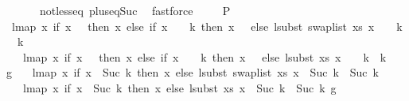 \begin{isabellebody}
\ \ \ \ \ \ not{\isacharunderscore}{\kern0pt}less{\isacharunderscore}{\kern0pt}eq\ plus{\isacharunderscore}{\kern0pt}{}{\isacharunderscore}{\kern0pt}eq{\isacharunderscore}{\kern0pt}Suc\ \isamarkupfalse%
\ fastforce\isanewline
\isanewline
\isanewline
\ \ \ \isamarkupfalse%
\ P{}{\isacharcolon}{\kern0pt}\isanewline
\ {\isachardoublequoteopen}lmap\ {\isacharparenleft}{\kern0pt}{\isasymlambda}x{\isachardot}{\kern0pt}\ if\ x\ {\isacharequal}{\kern0pt}\ {}\ then\ x\ else\ {\isacharparenleft}{\kern0pt}if\ x\ {\isacharminus}{\kern0pt}\ {}\ {\isacharless}{\kern0pt}\ k\ then\ x\ {\isacharminus}{\kern0pt}\ {}\ else\ lsubst\ {\isacharparenleft}{\kern0pt}swap{\isacharunderscore}{\kern0pt}list\ xs{\isacharparenright}{\kern0pt}\ {\isacharparenleft}{\kern0pt}x\ {\isacharminus}{\kern0pt}\ {}\ {\isacharminus}{\kern0pt}\ k{\isacharparenright}{\kern0pt}\ {\isacharplus}{\kern0pt}\ k{\isacharparenright}{\kern0pt}\ {\isacharplus}{\kern0pt}\ {}{\isacharparenright}{\kern0pt}\isanewline
\ \ \ {\isacharparenleft}{\kern0pt}lmap\ {\isacharparenleft}{\kern0pt}{\isasymlambda}x{\isachardot}{\kern0pt}\ if\ x\ {\isacharequal}{\kern0pt}\ {}\ then\ x\ else\ {\isacharparenleft}{\kern0pt}if\ x\ {\isacharminus}{\kern0pt}\ {}\ {\isacharless}{\kern0pt}\ k\ then\ x\ {\isacharminus}{\kern0pt}\ {}\ else\ lsubst\ xs\ {\isacharparenleft}{\kern0pt}x\ {\isacharminus}{\kern0pt}\ {}\ {\isacharminus}{\kern0pt}\ k{\isacharparenright}{\kern0pt}\ {\isacharplus}{\kern0pt}\ k{\isacharparenright}{\kern0pt}\ {\isacharplus}{\kern0pt}\ {}{\isacharparenright}{\kern0pt}\ g{\isacharprime}{\kern0pt}{\isacharparenright}{\kern0pt}\ {\isacharequal}{\kern0pt}\isanewline
\ \ lmap\ {\isacharparenleft}{\kern0pt}{\isasymlambda}x{\isachardot}{\kern0pt}\ if\ x\ {\isacharless}{\kern0pt}\ Suc\ k\ then\ x\ else\ lsubst\ {\isacharparenleft}{\kern0pt}swap{\isacharunderscore}{\kern0pt}list\ xs{\isacharparenright}{\kern0pt}\ {\isacharparenleft}{\kern0pt}x\ {\isacharminus}{\kern0pt}\ {\isacharparenleft}{\kern0pt}Suc\ k{\isacharparenright}{\kern0pt}{\isacharparenright}{\kern0pt}\ {\isacharplus}{\kern0pt}\ {\isacharparenleft}{\kern0pt}Suc\ k{\isacharparenright}{\kern0pt}{\isacharparenright}{\kern0pt}\isanewline
\ \ \ {\isacharparenleft}{\kern0pt}lmap\ {\isacharparenleft}{\kern0pt}{\isasymlambda}x{\isachardot}{\kern0pt}\ if\ x\ {\isacharless}{\kern0pt}\ Suc\ k\ then\ x\ else\ lsubst\ xs\ {\isacharparenleft}{\kern0pt}x\ {\isacharminus}{\kern0pt}\ {\isacharparenleft}{\kern0pt}Suc\ k{\isacharparenright}{\kern0pt}{\isacharparenright}{\kern0pt}\ {\isacharplus}{\kern0pt}\ {\isacharparenleft}{\kern0pt}Suc\ k{\isacharparenright}{\kern0pt}{\isacharparenright}{\kern0pt}\ g{\isacharprime}{\kern0pt}{\isacharparenright}{\kern0pt}{\isachardoublequoteclose}\isanewline

\end{isabellebody}
